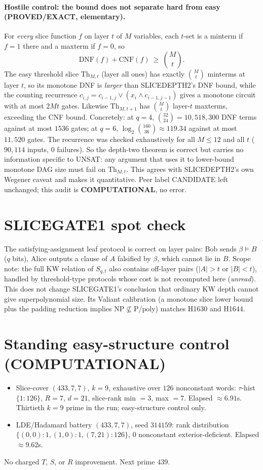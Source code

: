 \documentclass[11pt]{article}
\begin{document}
\paragraph{Hostile control: the bound does not separate hard from easy (PROVED/EXACT, elementary).}
For \emph{every} slice function $f$ on layer $t$ of $M$ variables, each $t$-set is a minterm if $f=1$ there and a maxterm if $f=0$, so
\[
\mathrm{DNF}(f)+\mathrm{CNF}(f)\ \ge\ \binom Mt .
\]
The easy threshold slice $\mathrm{Th}_{M,t}$ (layer all ones) has exactly $\binom Mt$ minterms at layer $t$, so its monotone DNF is
\emph{larger} than SLICEDEPTH2's DNF bound, while the counting recurrence $c_{i,j}=c_{i-1,j}\vee(x_i\wedge c_{i-1,j-1})$ gives a
monotone circuit with at most $2Mt$ gates. Likewise $\mathrm{Th}_{M,t+1}$ has $\binom Mt$ layer-$t$ maxterms, exceeding the CNF bound.
Concretely: at $q=4$, $\binom{32}{24}=10{,}518{,}300$ DNF terms against at most $1536$ gates; at $q=6$, $\log_2\binom{160}{36}\approx119.34$
against at most $11{,}520$ gates. The recurrence was checked exhaustively for all $M\le12$ and all $t$ ($90{,}114$ inputs, $0$ failures).
So the depth-two theorem is correct but carries no information specific to UNSAT: any argument that uses it to lower-bound
monotone DAG size must fail on $\mathrm{Th}_{M,t}$. This agrees with SLICEDEPTH2's own Wegener caveat and makes it quantitative.
Peer label CANDIDATE left unchanged; this audit is \textbf{COMPUTATIONAL}, no error.

\section*{SLICEGATE1 spot check}
The satisfying-assignment leaf protocol is correct on layer pairs: Bob sends $\beta\models B$ ($q$ bits), Alice outputs a clause
of $A$ falsified by $\beta$, which cannot lie in $B$. Scope note: the full KW relation of $S_{q,t}$ also contains off-layer pairs
($|A|>t$ or $|B|<t$), handled by threshold-type protocols whose cost is not recomputed here (\emph{unread}). This does not change
SLICEGATE1's conclusion that ordinary KW depth cannot give superpolynomial size. Its Valiant calibration (a monotone slice lower
bound plus the padding reduction implies $\mathrm{NP}\not\subseteq\mathrm{P/poly}$) matches H1630 and H1644.

\section*{Standing easy-structure control (COMPUTATIONAL)}
\begin{itemize}
\item Slice-cover $(433,7,7)$, $k=9$, exhaustive over $126$ nonconstant words: $\tau$-hist $\{1{:}126\}$, $R=7$, $d=21$,
slice-rank min $=3$, max $=7$. Elapsed $\approx6.91$s. Thirtieth $k{=}9$ prime in the run; easy-structure control only.
\item LDE/Hadamard battery $(433,7,7)$, seed $314159$: rank distribution $\{(0,0){:}1,(1,0){:}1,(7,21){:}126\}$,
$0$ nonconstant exterior-deficient. Elapsed $\approx9.62$s.
\end{itemize}
No charged $T$, $S$, or $R$ improvement. Next prime $439$.
\end{document}
